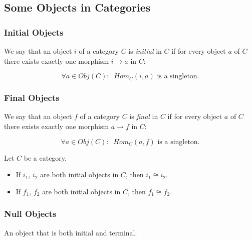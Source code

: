 \subsection{Some Objects in Categories}\label{someobjects}

\subsubsection{Initial Objects}\label{initial}

We say that an object $i$ of a category $C$ is \emph{initial} in $C$ if for every object $a$ of $C$ there exists exactly one morphism $i \rightarrow a$ in $C$:

$$\forall a \in Obj(C): \; \; Hom_C(i,a) \textrm{ is a singleton}.$$

\subsubsection{Final Objects}\label{final}

We say that an object $f$ of a category $C$ is \emph{final} in $C$ if for every object $a$ of $C$ there exists exactly one morphism $a \rightarrow f$ in $C$:

$$\forall a \in Obj(C): \; \; Hom_C(a,f) \textrm{ is a singleton}.$$

\begin{proposition}
Let $C$ be a category.
\begin{itemize}
  \item If $i_1$, $i_2$ are both initial objects in $C$, then $i_1 \cong i_2$.
  \item If $f_1$, $f_2$ are both initial objects in $C$, then $f_1 \cong f_2$.
\end{itemize}
\end{proposition}

\subsubsection{Null Objects}\label{null}

An object that is both initial and terminal.